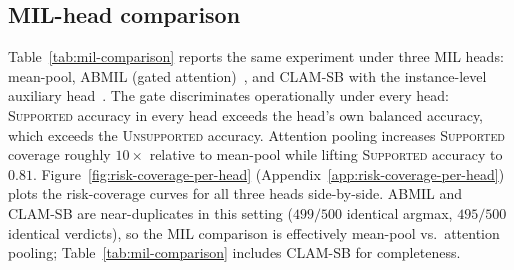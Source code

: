 \documentclass{article}
\newcommand{\SafeNum}[1]{#1}
\begin{document}
\subsection{MIL-head comparison}
\label{sec:mil-comparison}

Table~\ref{tab:mil-comparison} reports the same experiment under three MIL heads: mean-pool, ABMIL (gated attention)~\citep{ilse2018attention}, and CLAM-SB with the instance-level auxiliary head~\citep{lu2021clam}. The gate discriminates operationally under every head: \textsc{Supported} accuracy in every head exceeds the head's own balanced accuracy, which exceeds the \textsc{Unsupported} accuracy. Attention pooling increases \textsc{Supported} coverage roughly $\SafeNum{10}\times$ relative to mean-pool while lifting \textsc{Supported} accuracy to $\SafeNum{0.81}$. Figure~\ref{fig:risk-coverage-per-head} (Appendix~\ref{app:risk-coverage-per-head}) plots the risk-coverage curves for all three heads side-by-side. ABMIL and CLAM-SB are near-duplicates in this setting ($\SafeNum{499}/\SafeNum{500}$ identical argmax, $\SafeNum{495}/\SafeNum{500}$ identical verdicts), so the MIL comparison is effectively mean-pool vs.\ attention pooling; Table~\ref{tab:mil-comparison} includes CLAM-SB for completeness.
\end{document}
